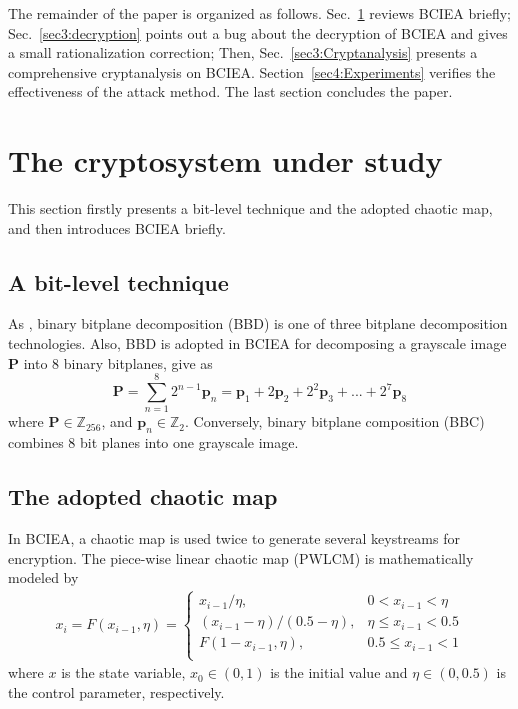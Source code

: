 \documentclass[final,3p,times,twocolumn]{elsarticle}
\begin{document}
The remainder of the paper is organized as follows. Sec.~\ref{sec2:BCIEA} reviews BCIEA briefly;
Sec.~\ref{sec3:decryption} points out a bug about the decryption of BCIEA and gives a small rationalization correction;
Then, Sec.~\ref{sec3:Cryptanalysis} presents a comprehensive cryptanalysis on BCIEA. 
Section~\ref{sec4:Experiments} verifies the effectiveness of the attack method. The last section concludes the paper.

\section{The cryptosystem under study}
\label{sec2:BCIEA}

This section firstly presents a bit-level technique and the adopted chaotic map, and then introduces BCIEA briefly.

\subsection{A bit-level technique}

As \cite{ZhouY2014SP}, binary bitplane decomposition (BBD) is one of three bitplane decomposition technologies. Also, BBD is adopted in BCIEA for decomposing a grayscale image $\bm{P}$ into 8 binary bitplanes, give as
\begin{equation}
\bm{P} = \sum\limits_{n = 1}^{8} {2^{n - 1}\bm{p}_n} = \bm{p}_1 + 2\bm{p}_2 + 2^2\bm{p}_3 + ... + 2^{7}\bm{p}_{8}
\label{eq:BBD}
\end{equation}
where $\bm{P} \in \mathbb{Z}_{256}$, and $\bm{p}_n \in \mathbb{Z}_2$. Conversely, binary bitplane composition (BBC) combines 8 bit planes into one grayscale image.

\subsection{The adopted chaotic map}

In BCIEA, a chaotic map is used twice to generate several keystreams for encryption. The piece-wise linear chaotic map (PWLCM) is mathematically modeled by
\begin{equation}
\begin{aligned}
x_i = F(x_{i-1},\eta)=	\begin{cases}
x_{i-1}/ \eta,              & 0<x_{i-1}<\eta \\
(x_{i-1}- \eta)/(0.5-\eta), & \eta \le x_{i-1}<0.5 \\
F(1-x_{i-1},\eta),          & 0.5 \le x_{i-1}<1 \\
\end{cases}
\end{aligned}
\label{eq:PWLCM}
\end{equation}
where $x$ is the state variable, $x_0 \in (0,1)$ is the initial value and $\eta \in (0,0.5)$ is the control parameter, respectively. 
\end{document}
